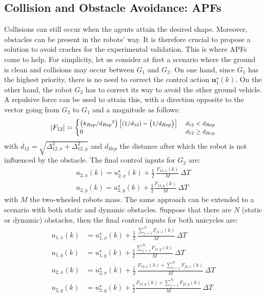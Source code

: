 \documentclass{ifacconf}
\begin{document}
\subsection{Collision and Obstacle Avoidance: APFs}
Collisions can still occur when the agents attain the desired shape.
Moreover, obstacles can be present in the robots' way.
It is therefore crucial to propose a solution to avoid craches 
for the experimental validation.
This is where APFs come to help.
For simplicity, let us consider at first a scenario where the ground
is clean and collisions may occur between $G_1$ and $G_2$.
On one hand, since $G_1$ has the highest priority, 
there is no need to correct the control action 
$\boldsymbol{u}^\star_{1}(k)$.
On the other hand, the robot $G_2$ has to correct 
its way to avoid the other ground vehicle.
A repulsive force can be used to attain this,
with a direction opposite to the vector going from $G_2$ to $G_1$
and a magnitude as follows:
\begin{equation}
    \footnotesize
    \left\lvert {F}_{12} \right\rvert  = \begin{cases}
       \left(k_{Rep}/{d_{Rep}}^2\right) \left[\left(1/d_{12}\right) - \left(1/d_{Rep}\right)\right]  \ & d_{12} < d_{Rep}\\
        0 \ & d_{12} \geq d_{Rep}\\
\end{cases} 
\end{equation}
with $d_{12} = \sqrt{\Delta_{12,x}^2 + \Delta_{12,y}^2}$ and 
$d_{Rep}$ the distance after which the robot is not influenced 
by the obstacle.
The final control inputs for $G_2$ are:
\begin{equation}
\begin{aligned}
    u_{2,x}(k) = u^\star_{2,x}(k) + \frac{1}{2}\,\frac{F_{12,x}(k)}{M}\, \Delta T \\
    u_{2,y}(k) = u^\star_{2,y}(k) + \frac{1}{2} \frac{F_{12,y}(k)}{M} \, \Delta T
\end{aligned}
\end{equation}
with $M$ the two-wheeled robots mass.
The same approach can be extended to a scenario with both static and dynamic obstacles.
Suppose that there are $N$ (static or dynamic) obstacles, 
then the final control inputs for both unicycles are:
\begin{equation}
\begin{aligned}
    u_{1,x}(k) &= u^\star_{1,x}(k) + \frac{1}{2}\,\frac{
        \sum^N_{j=1} F_{j1,x}(k)
        }{M}\, \Delta T \\
    u_{1,y}(k) &= u^\star_{1,y}(k) + \frac{1}{2} \frac{
        \sum^N_{j=1} F_{j1,y}(k)
        }{M} \, \Delta T \\
    u_{2,x}(k) &= u^\star_{2,x}(k) + \frac{1}{2}\,\frac{
        F_{12,x}(k) + \sum^N_{j=1} F_{j2,x}(k)
        }{M}\, \Delta T \\
    u_{2,y}(k) &= u^\star_{2,y}(k) + \frac{1}{2} \frac{
        F_{12,y}(k) + \sum^N_{j=1} F_{j2,y}(k)
        }{M} \, \Delta T
\end{aligned}
\end{equation}
\end{document}
